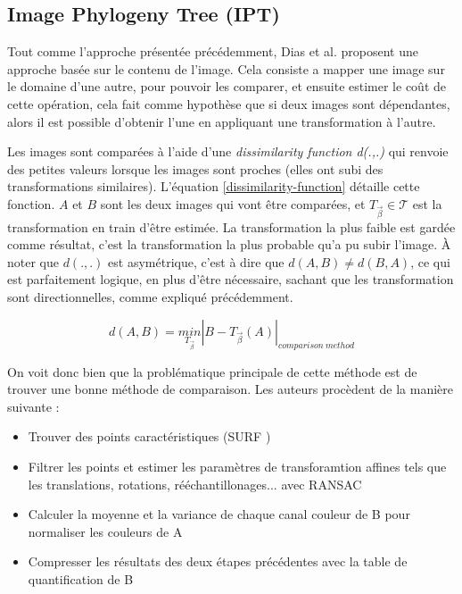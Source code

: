 \documentclass[utf8]{stageM2R} %
\begin{document}
\subsection{Image Phylogeny Tree (IPT)}

Tout comme l'approche présentée précédemment, Dias et al. \cite{dias2010first}\cite{dias2012image} proposent une approche basée sur le contenu de l'image. Cela consiste a mapper une image sur le domaine d'une autre, pour pouvoir les comparer, et ensuite estimer le coût de cette opération, cela fait comme hypothèse que si deux images sont dépendantes, alors il est possible d'obtenir l'une en appliquant une transformation à l'autre. 

Les images sont comparées à l'aide d'une \textit{dissimilarity function d(.,.)} qui renvoie des petites valeurs lorsque les images sont proches (elles ont subi des transformations similaires). L'équation \ref{dissimilarity-function} détaille cette fonction. $A$ et $B$ sont les deux images qui vont être comparées, et $T_{\overrightarrow{\beta}} \in \mathcal{T}$ est la transformation en train d'être estimée. La transformation la plus faible est gardée comme résultat, c'est la transformation la plus probable qu'a pu subir l'image. À noter que $d(.,.)$ est asymétrique, c'est à dire que $d(A,B) \neq d(B,A)$, ce qui est parfaitement logique, en plus d'être nécessaire, sachant que les transformation sont directionnelles, comme expliqué précédemment.

\begin{equation}
  d(A,B) = \underset{T_{\overrightarrow{\beta}}}{min}\left | B - T_{\overrightarrow{\beta}}(A) \right |_{comparison\ method}
  \label{dissimilarity-function}
\end{equation}

On voit donc bien que la problématique principale de cette méthode est de trouver une bonne méthode de comparaison. Les auteurs procèdent de la manière suivante : 
\begin{itemize}
  \item Trouver des points caractéristiques (SURF \cite{bay2008speeded})
  \item Filtrer les points et estimer les paramètres de transforamtion affines tels que les translations, rotations, rééchantillonages... avec RANSAC \cite{ransac}
  \item Calculer la moyenne et la variance de chaque canal couleur de B pour normaliser les couleurs de A
  \item Compresser les résultats des deux étapes précédentes avec la table de quantification de B
\end{itemize}
\end{document}
